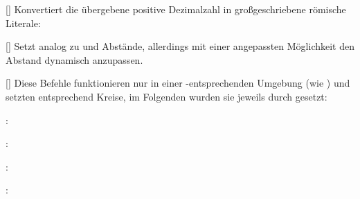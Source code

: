 %
%
%

[]
Konvertiert die übergebene positive Dezimalzahl in großgeschriebene römische Literale:
\begin{latex*}
\end{latex*}

%
%
%

[\cmdlist{}]
Setzt analog zu  und  Abstände, allerdings mit einer angepassten Möglichkeit den Abstand dynamisch anzupassen.

%
%
%

[\cmdlist{}\cmdlist{}\cmdlist\secline{}]
Diese Befehle funktionieren nur in einer -entsprechenden Umgebung (wie ) und setzten entsprechend Kreise, im Folgenden wurden sie jeweils durch  gesetzt: \vspace{-0.75\baselineskip}
\begin{multicols}{2}%
    \begin{ditemize}\narrowitems
        \item {}: 
        \item {}: 
        \item {}: 
        \item {}: 
    \end{ditemize}
\end{multicols}

%
%
%


